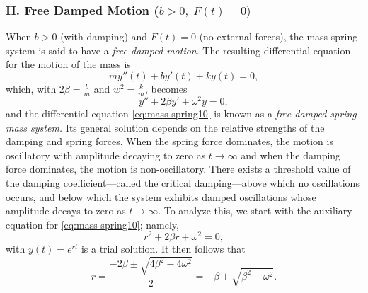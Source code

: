 	
\subsubsection{II. Free Damped Motion
	($b>0, \;F(t) = 0)$} 
	When $b> 0$ (with damping) and $F(t) = 0$ (no external forces), the mass-spring system is said to have a \textit{free damped motion}. The resulting differential equation for the motion of the mass is 
	\[	my''(t)+by'(t) + k y(t) = 0,\] which, with $2\beta = \frac{b}{m}$ and $w^2 = \frac{k}{m}$,  becomes
	\begin{equation}\label{eq:mass-spring10}
		y'' + 2\beta y'+ \omega^2 y = 0,
	\end{equation}
	and 
the differential equation \eqref{eq:mass-spring10} is known as a \textit{free damped spring–mass system.} Its general solution depends on the relative strengths of the damping and spring forces. When the spring force dominates, the motion is oscillatory with amplitude decaying to zero  as \( t \to \infty \) and when the damping force dominates, the motion is non-oscillatory. There exists a threshold value of the damping coefficient—called the critical damping—above which no oscillations occurs, and below which the system exhibits damped oscillations whose amplitude decays to zero as \( t \to \infty \). To analyze this, we start with the auxiliary equation for \eqref{eq:mass-spring10}; namely,
\[r^2 + 2\beta r + \omega ^2 =0,\] with $y(t)=e^{rt}$ is a trial solution. It then follows that 
\begin{equation}\label{eq:mass-spring11}
	r = \frac{-2\beta\pm\sqrt{4\beta^2 - 4 \omega^2}}{2} = -\beta\pm\sqrt{\beta^2 -  \omega^2}. \end{equation}
	
